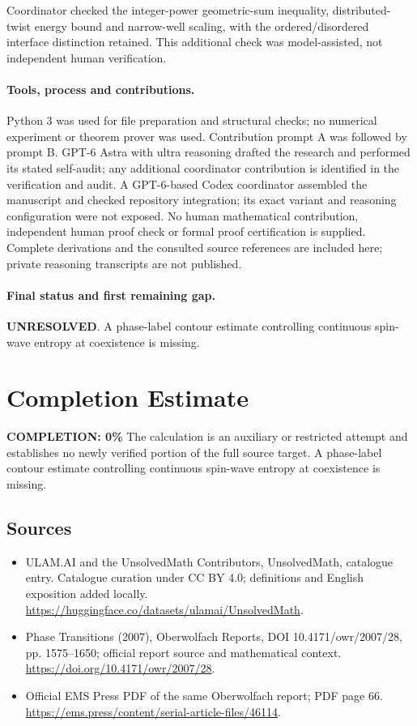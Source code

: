 \documentclass[11pt]{article}
\begin{document}
Coordinator checked the integer-power geometric-sum inequality, distributed-twist energy bound and narrow-well scaling, with the ordered/disordered interface distinction retained. This additional check was model-assisted, not independent human verification.

\paragraph{Tools, process and contributions.}
Python 3 was used for file preparation and structural checks; no numerical experiment or theorem prover was used. Contribution prompt A was followed by prompt B. GPT-6 Astra with ultra reasoning drafted the research and performed its stated self-audit; any additional coordinator contribution is identified in the verification and audit. A GPT-6-based Codex coordinator assembled the manuscript and checked repository integration; its exact variant and reasoning configuration were not exposed. No human mathematical contribution, independent human proof check or formal proof certification is supplied. Complete derivations and the consulted source references are included here; private reasoning transcripts are not published.

\paragraph{Final status and first remaining gap.}
\textbf{UNRESOLVED}. A phase-label contour estimate controlling continuous spin-wave entropy at coexistence is missing.

\section{Completion Estimate}
\noindent\textbf{COMPLETION: 0\%}
The calculation is an auxiliary or restricted attempt and establishes no newly verified portion of the full source target. A phase-label contour estimate controlling continuous spin-wave entropy at coexistence is missing.

\subsection{Sources}
\begin{itemize}
\item[\hypertarget{source:statement:1}{S1}] ULAM.AI and the UnsolvedMath Contributors, UnsolvedMath, catalogue entry. Catalogue curation under CC BY 4.0; definitions and English exposition added locally.
\url{https://huggingface.co/datasets/ulamai/UnsolvedMath}.
\item[\hypertarget{source:statement:2}{S2}] Phase Transitions (2007), Oberwolfach Reports, DOI 10.4171/owr/2007/28, pp. 1575--1650; official report source and mathematical context.
\url{https://doi.org/10.4171/owr/2007/28}.
\item[\hypertarget{source:statement:3}{S3}] Official EMS Press PDF of the same Oberwolfach report; PDF page 66.
\url{https://ems.press/content/serial-article-files/46114}.
\end{itemize}
\label{end:statement}
\end{document}
